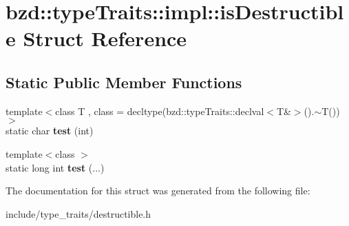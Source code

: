 \hypertarget{structbzd_1_1typeTraits_1_1impl_1_1isDestructible}{}\section{bzd\+:\+:type\+Traits\+:\+:impl\+:\+:is\+Destructible Struct Reference}
\label{structbzd_1_1typeTraits_1_1impl_1_1isDestructible}
\subsection*{Static Public Member Functions}
\begin{DoxyCompactItemize}
\item 
\mbox{\label{structbzd_1_1typeTraits_1_1impl_1_1isDestructible_af0aeacbc1a7334ae27a32a8bd0b68e9d}} 
{\footnotesize template$<$class T , class  = decltype(bzd\+::type\+Traits\+::declval$<$\+T\&$>$().$\sim$\+T())$>$ }\\static char {\bfseries test} (int)
\item 
\mbox{\label{structbzd_1_1typeTraits_1_1impl_1_1isDestructible_a3b138901ceb88c3494c25e3b40ef6164}} 
{\footnotesize template$<$class $>$ }\\static long int {\bfseries test} (...)
\end{DoxyCompactItemize}


The documentation for this struct was generated from the following file\+:\begin{DoxyCompactItemize}
\item 
include/type\+\_\+traits/destructible.\+h\end{DoxyCompactItemize}
